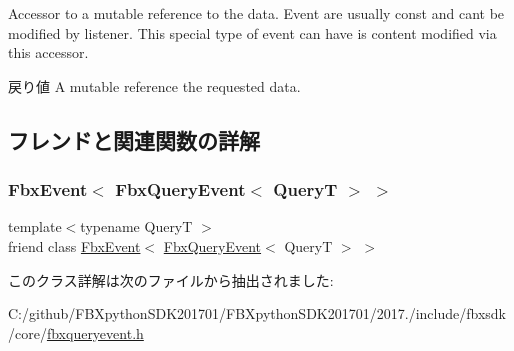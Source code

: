 Accessor to a mutable reference to the data. Event are usually const and can\textquotesingle{}t be modified by listener. This special type of event can have is content modified via this accessor. \begin{DoxyReturn}{戻り値}
A mutable reference the requested data. 
\end{DoxyReturn}


\subsection{フレンドと関連関数の詳解}
\mbox{\label{class_fbx_query_event_ade3703dd283c116fbf29343f18ed9daa}} 
\subsubsection{\texorpdfstring{Fbx\+Event$<$ Fbx\+Query\+Event$<$ Query\+T $>$ $>$}{FbxEvent< FbxQueryEvent< QueryT > >}}
{\footnotesize\ttfamily template$<$typename QueryT $>$ \\
friend class \hyperlink{class_fbx_event}{Fbx\+Event}$<$ \hyperlink{class_fbx_query_event}{Fbx\+Query\+Event}$<$ QueryT $>$ $>$\hspace{0.3cm}{\ttfamily [friend]}}



このクラス詳解は次のファイルから抽出されました\+:\begin{DoxyCompactItemize}
\item 
C\+:/github/\+F\+B\+Xpython\+S\+D\+K201701/\+F\+B\+Xpython\+S\+D\+K201701/2017./include/fbxsdk/core/\hyperlink{fbxqueryevent_8h}{fbxqueryevent.\+h}\end{DoxyCompactItemize}
